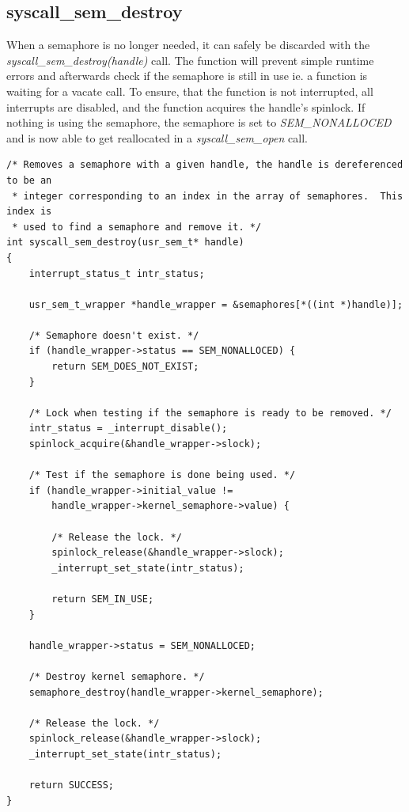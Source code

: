 \documentclass[11pt]{article}
\begin{document}
\subsection{syscall\_sem\_destroy}
When a semaphore is no longer needed, it can safely be discarded with the \\ \emph{syscall\_sem\_destroy(handle)} call. The function will prevent simple runtime errors and afterwards check if the semaphore is still in use ie. a function is waiting for a vacate call. To ensure, that the function is not interrupted, all interrupts are disabled, and the function acquires the handle's spinlock. If nothing is using the semaphore, the semaphore is set to \emph{SEM\_NONALLOCED} and is now able to get reallocated in a \emph{syscall\_sem\_open} call.
\begin{lstlisting}[style=customc]
/* Removes a semaphore with a given handle, the handle is dereferenced to be an
 * integer corresponding to an index in the array of semaphores.  This index is
 * used to find a semaphore and remove it. */
int syscall_sem_destroy(usr_sem_t* handle)
{
    interrupt_status_t intr_status;

    usr_sem_t_wrapper *handle_wrapper = &semaphores[*((int *)handle)];

    /* Semaphore doesn't exist. */
    if (handle_wrapper->status == SEM_NONALLOCED) {
        return SEM_DOES_NOT_EXIST;
    }

    /* Lock when testing if the semaphore is ready to be removed. */
    intr_status = _interrupt_disable();
    spinlock_acquire(&handle_wrapper->slock);

    /* Test if the semaphore is done being used. */
    if (handle_wrapper->initial_value !=
        handle_wrapper->kernel_semaphore->value) {

        /* Release the lock. */
        spinlock_release(&handle_wrapper->slock);
        _interrupt_set_state(intr_status);

        return SEM_IN_USE;
    }

    handle_wrapper->status = SEM_NONALLOCED;

    /* Destroy kernel semaphore. */
    semaphore_destroy(handle_wrapper->kernel_semaphore);

    /* Release the lock. */
    spinlock_release(&handle_wrapper->slock);
    _interrupt_set_state(intr_status);

    return SUCCESS;
}
\end{lstlisting}
\end{document}
